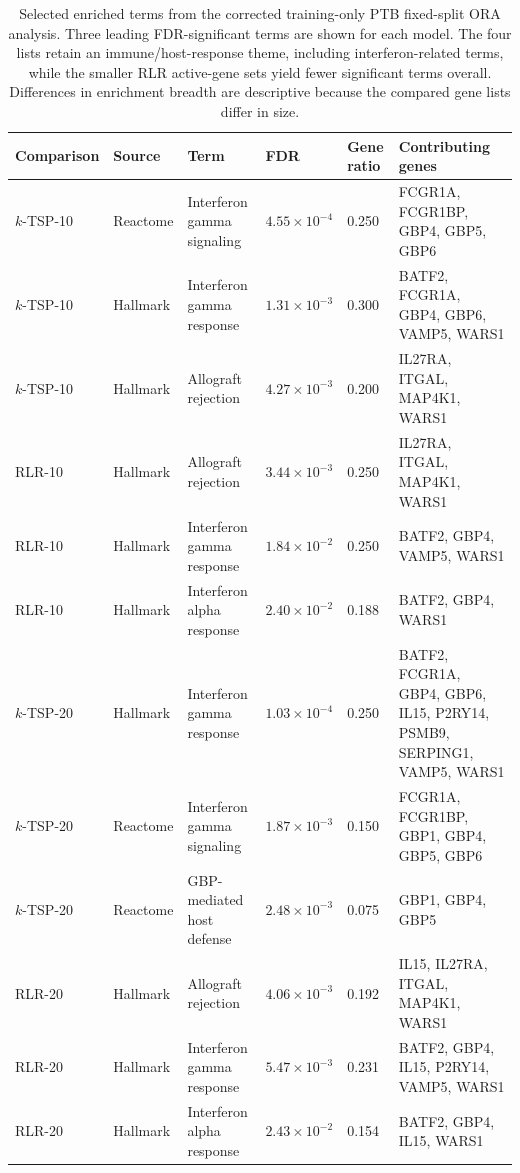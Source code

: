 \documentclass[11pt, a4paper]{article}
\begin{document}
\begin{table}[!htbp]
\centering
\caption{Selected enriched terms from the corrected training-only PTB fixed-split ORA analysis. Three leading FDR-significant terms are shown for each model. The four lists retain an immune/host-response theme, including interferon-related terms, while the smaller RLR active-gene sets yield fewer significant terms overall. Differences in enrichment breadth are descriptive because the compared gene lists differ in size.}
\label{tab:ptb_ora_top_terms}
{\scriptsize
\setlength{\tabcolsep}{3pt}
\renewcommand{\arraystretch}{1.15}
\begin{tabular}{L{0.11\textwidth}L{0.08\textwidth}L{0.21\textwidth}C{0.095\textwidth}C{0.07\textwidth}L{0.28\textwidth}}
\toprule
\textbf{Comparison} & \textbf{Source} & \textbf{Term} & \textbf{FDR} & \textbf{Gene ratio} & \textbf{Contributing genes} \\
\midrule
$k$-TSP-10 & Reactome & Interferon gamma signaling & $4.55\times10^{-4}$ & 0.250 & FCGR1A, FCGR1BP, GBP4, GBP5, GBP6 \\
$k$-TSP-10 & Hallmark & Interferon gamma response & $1.31\times10^{-3}$ & 0.300 & BATF2, FCGR1A, GBP4, GBP6, VAMP5, WARS1 \\
$k$-TSP-10 & Hallmark & Allograft rejection & $4.27\times10^{-3}$ & 0.200 & IL27RA, ITGAL, MAP4K1, WARS1 \\
\midrule
RLR-10 & Hallmark & Allograft rejection & $3.44\times10^{-3}$ & 0.250 & IL27RA, ITGAL, MAP4K1, WARS1 \\
RLR-10 & Hallmark & Interferon gamma response & $1.84\times10^{-2}$ & 0.250 & BATF2, GBP4, VAMP5, WARS1 \\
RLR-10 & Hallmark & Interferon alpha response & $2.40\times10^{-2}$ & 0.188 & BATF2, GBP4, WARS1 \\
\midrule
$k$-TSP-20 & Hallmark & Interferon gamma response & $1.03\times10^{-4}$ & 0.250 & BATF2, FCGR1A, GBP4, GBP6, IL15, P2RY14, PSMB9, SERPING1, VAMP5, WARS1 \\
$k$-TSP-20 & Reactome & Interferon gamma signaling & $1.87\times10^{-3}$ & 0.150 & FCGR1A, FCGR1BP, GBP1, GBP4, GBP5, GBP6 \\
$k$-TSP-20 & Reactome & GBP-mediated host defense & $2.48\times10^{-3}$ & 0.075 & GBP1, GBP4, GBP5 \\
\midrule
RLR-20 & Hallmark & Allograft rejection & $4.06\times10^{-3}$ & 0.192 & IL15, IL27RA, ITGAL, MAP4K1, WARS1 \\
RLR-20 & Hallmark & Interferon gamma response & $5.47\times10^{-3}$ & 0.231 & BATF2, GBP4, IL15, P2RY14, VAMP5, WARS1 \\
RLR-20 & Hallmark & Interferon alpha response & $2.43\times10^{-2}$ & 0.154 & BATF2, GBP4, IL15, WARS1 \\
\bottomrule
\end{tabular}
}
\end{table}
\end{document}
